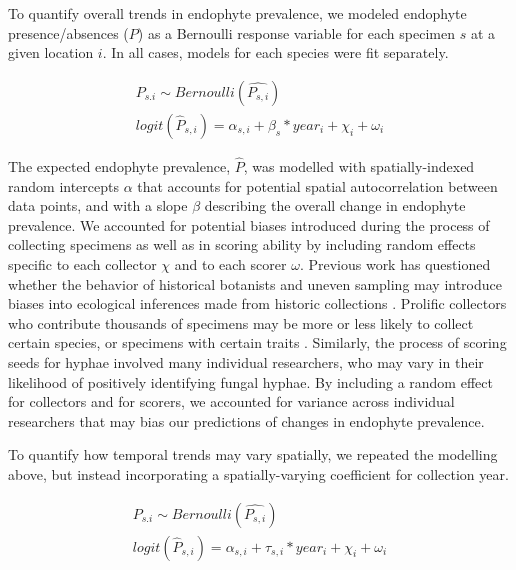 \documentclass[11pt]{article}
\let\cite\citep
\begin{document}
To quantify overall trends in endophyte prevalence, we modeled endophyte presence/absences ($P$)  as a Bernoulli response variable for each specimen $s$ at a given location $i$.
In all cases, models for each species were fit separately.



\begin{subequations}
	\label{eq:trends}
	\begin{align}
		P_{s.i} \sim Bernoulli(\hat{P_{s,i}}) \\
		logit(\hat{P}_{s,i}) = \alpha_{s,i} + \beta_{s}*year_i+
		\chi_{i} + \omega_{i} 
	\end{align}
\end{subequations}

The expected endophyte prevalence, $\hat{P}$, was modelled with spatially-indexed random intercepts $\alpha$ that accounts for potential spatial autocorrelation between data points, and with a slope $\beta$ describing the overall change in endophyte prevalence. 
We accounted for potential biases introduced during the process of collecting specimens as well as in scoring ability by including random effects specific to each collector $\chi$ and to each scorer $\omega$.
Previous work has questioned whether the behavior of historical botanists and uneven sampling may introduce biases into ecological inferences made from historic collections \cite{kozlov2020biases}. 
Prolific collectors who contribute thousands of specimens may be more or less likely to collect certain species, or specimens with certain traits \cite{daru2018widespread}. 
Similarly, the process of scoring seeds for hyphae involved many individual researchers, who may vary in their likelihood of positively identifying fungal hyphae. 
By including a random effect for collectors and for scorers, we accounted for variance across individual researchers that may bias our predictions of changes in endophyte prevalence.


To quantify how temporal trends may vary spatially, we repeated the modelling above, but instead incorporating a spatially-varying coefficient for collection year. 

\begin{subequations}
	\label{eq:trends}
	\begin{align}
		P_{s.i} \sim Bernoulli(\hat{P_{s,i}}) \\
		logit(\hat{P}_{s,i}) = \alpha_{s,i} + \tau_{s,i}*year_i +
		\chi_{i} + \omega_{i} 
	\end{align}
\end{subequations}
\end{document}
